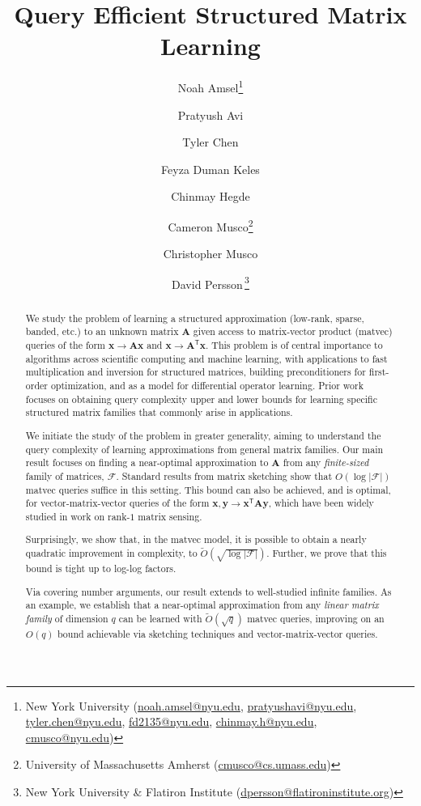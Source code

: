 \documentclass{article}[11pt]
\title{Query Efficient Structured Matrix Learning}
\author{
    Noah Amsel\thanks{New York University (\url{noah.amsel@nyu.edu}, \url{pratyushavi@nyu.edu}, \url{tyler.chen@nyu.edu}, \url{fd2135@nyu.edu}, \url{chinmay.h@nyu.edu}, \url{cmusco@nyu.edu})} \and
    Pratyush Avi\footnotemark[1]\and
    Tyler Chen\footnotemark[1]\and
    Feyza Duman Keles\footnotemark[1]\and
    Chinmay Hegde\footnotemark[1]\and
    Cameron Musco\thanks{University of Massachusetts Amherst (\url{cmusco@cs.umass.edu})}\and
    Christopher Musco\footnotemark[1]\and
    David Persson\footnotemark[1]\,\thanks{New York University \& Flatiron Institute (\url{dpersson@flatironinstitute.org})} 
}
\date{}
\theoremstyle{definition}
\newcommand{\bv}[1]{\boldsymbol{\mathbf{#1}}}
\newcommand{\transpose}{\mathsf{T}}
\begin{document}
\maketitle

\begin{abstract}
    We study the problem of learning a structured approximation (low-rank, sparse, banded, etc.) to an unknown matrix $\bv{A}$ given access to matrix-vector product (matvec) queries of the form $\bv{x} \rightarrow \bv{A}\bv{x}$ and $\bv{x} \rightarrow \bv{A}^\transpose \bv{x}$. This problem is of central importance to algorithms across scientific computing and machine learning, with applications to fast multiplication and inversion for structured matrices, building preconditioners for first-order optimization, and as a model for differential operator learning. Prior work focuses on obtaining query complexity upper and lower bounds for learning specific structured matrix families that commonly arise in applications. 
    
    We initiate the study of the problem in greater generality, aiming to understand the query complexity of learning approximations from general matrix families. Our main result focuses on finding a near-optimal approximation to $\bv{A}$ from any \emph{finite-sized} family of matrices, $\mathcal{F}$. Standard results from matrix sketching show that $O(\log|\mathcal{F}|)$ matvec queries suffice in this setting. This bound can also be achieved, and is optimal, for vector-matrix-vector queries of the form $\bv{x},\bv{y}\rightarrow \bv{x}^\transpose\bv{A}\bv{y}$, which have been widely studied in work on rank-$1$ matrix sensing.
    
    Surprisingly, we show that, in the matvec model, it is possible to obtain a nearly quadratic improvement in complexity, to $\tilde{O}(\sqrt{\log|\mathcal{F}|})$. Further, we prove that this bound is tight up to log-log factors.

    Via covering number arguments, our result extends to well-studied infinite families. As an example, we establish that a near-optimal approximation from any \emph{linear matrix family} of dimension $q$ can be learned with $\tilde{O}(\sqrt{q})$ matvec queries, improving on an $O(q)$ bound achievable via sketching techniques and vector-matrix-vector queries.
\end{abstract}
\end{document}
